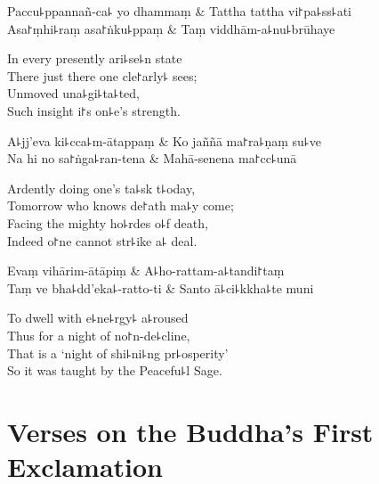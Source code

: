 \begin{twochants}
  Paccu꜕ppannañ-ca꜕ yo dhammaṃ & Tattha tattha vi꜓pa꜕ss꜕ati \\
  Asa꜓ṃhi꜕raṃ asa꜓ṅku꜕ppaṃ & Taṃ viddhām-a꜕nu꜕brūhaye \\
\end{twochants}

\begin{english}
  In every presently ari꜕se꜕n state\\
  There just there one cle꜓arly꜕ sees;\\
  Unmoved una꜕gi꜕ta꜕ted,\\
  Such insight i꜓s on꜕e's strength.
\end{english}

\begin{twochants}
  A꜕jj'eva ki꜕cca꜕m-ātappaṃ & Ko jaññā ma꜓ra꜕ṇaṃ su꜕ve \\
  Na hi no sa꜓ṅga꜕ran-tena & Mahā-senena ma꜓cc꜕unā \\
\end{twochants}

\begin{english}
  Ardently doing one's ta꜕sk t꜕oday,\\
  Tomorrow who knows de꜓ath ma꜕y come;\\
  Facing the mighty ho꜕rdes o꜕f death,\\
  Indeed o꜓ne cannot str꜕ike a꜕ deal.
\end{english}

\begin{twochants}
  Evaṃ vihārim-ātāpiṃ & A꜕ho-rattam-a꜕tandi꜓taṃ \\
  Taṃ ve bha꜕dd'eka꜕-ratto-ti & Santo ā꜕ci꜕kkha꜕te muni \\
\end{twochants}

\begin{english}
  To dwell with e꜕ne꜕rgy꜕ a꜕roused\\
  Thus for a night of no꜓n-de꜕cline,\\
  That is a `night of shi꜕ni꜕ng pr꜕osperity'\\
  So it was taught by the Peacefu꜕l Sage.
\end{english}

\chapter{Verses on the Buddha's First Exclamation}%

\begin{leader}
\end{leader}

